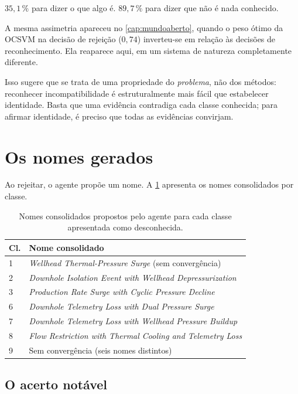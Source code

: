 \begin{destaque}
$35{,}1\,\%$ para dizer o que algo é. $89{,}7\,\%$ para dizer que não é nada conhecido.

A mesma assimetria apareceu no \cref{cap:mundoaberto}, quando o peso ótimo da OCSVM na
decisão de rejeição ($0{,}74$) inverteu-se em relação às decisões de reconhecimento. Ela
reaparece aqui, em um sistema de natureza completamente diferente.

Isso sugere que se trata de uma propriedade do \emph{problema}, não dos métodos:
reconhecer incompatibilidade é estruturalmente mais fácil que estabelecer identidade.
Basta que uma evidência contradiga cada classe conhecida; para afirmar identidade, é
preciso que todas as evidências convirjam.
\end{destaque}

\section{Os nomes gerados}

Ao rejeitar, o agente propõe um nome. A \cref{tab:ag-nomes} apresenta os nomes
consolidados por classe.

\begin{table}[htbp]
\centering
\caption{Nomes consolidados propostos pelo agente para cada classe apresentada como
desconhecida.}
\label{tab:ag-nomes}
\small
\begin{tabular}{lp{8.2cm}}
\toprule
\textbf{Cl.} & \textbf{Nome consolidado} \\
\midrule
1 & \emph{Wellhead Thermal-Pressure Surge} (sem convergência) \\
2 & \emph{Downhole Isolation Event with Wellhead Depressurization} \\
3 & \emph{Production Rate Surge with Cyclic Pressure Decline} \\
6 & \emph{Downhole Telemetry Loss with Dual Pressure Surge} \\
7 & \emph{Downhole Telemetry Loss with Wellhead Pressure Buildup} \\
8 & \emph{Flow Restriction with Thermal Cooling and Telemetry Loss} \\
9 & Sem convergência (seis nomes distintos) \\
\bottomrule
\end{tabular}
\end{table}

\subsection{O acerto notável}

